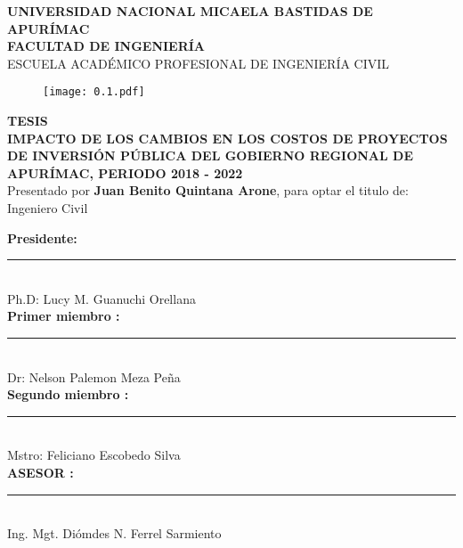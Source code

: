 \begin{titlepage}
	\begin{center}
		\textbf{\large{UNIVERSIDAD NACIONAL MICAELA BASTIDAS DE APURÍMAC}}\\
		\textbf{\large{FACULTAD DE INGENIERÍA}\\}
		\large{ESCUELA ACADÉMICO PROFESIONAL DE INGENIERÍA CIVIL}\\
		\vspace{2mm}
		\begin{figure}[h!]
			\centering
			\texttt{[image: 0.1.pdf]}
		\end{figure}
		\textbf{TESIS}\\
		\vspace{2mm} 
		\uppercase{\textbf{Impacto de los cambios en los costos de proyectos de inversión pública del gobierno regional de apurímac, periodo 2018 - 2022}}\\
		\vspace{3mm}
		Presentado por \textbf{Juan Benito Quintana Arone}, para optar el titulo de: Ingeniero Civil \\
		\vspace{2mm}

		\begin{center}
			\textbf{Presidente:} \hfill \rule{9cm}{0.4pt}\\
			\hspace{7cm} \textnormal{\sffamily Ph.D: Lucy M. Guanuchi Orellana} \\
			\vspace{5mm}
			\textbf{Primer miembro	:}\hfill \rule{9cm}{0.4pt}\\
			\hspace{7cm} \textnormal{\sffamily Dr: Nelson Palemon Meza Peña} \\		
			\vspace{5mm}
			\textbf{Segundo miembro	:}\hfill \rule{9cm}{0.4pt}\\
			\hspace{7cm} \textnormal{\sffamily Mstro: Feliciano Escobedo Silva} \\		
			\vspace{5mm}
			\textbf{ \large ASESOR	:} \hfill \rule{9cm}{0.4pt}\\	
			\hspace{7cm} {\normalsize Ing. Mgt. Diómdes N. Ferrel Sarmiento} \\	
		\end{center}
		
		\vfill
		
	\end{center}
\end{titlepage}
